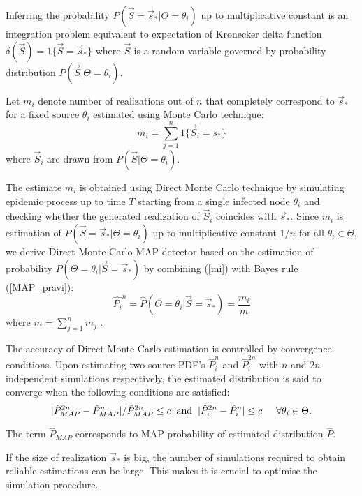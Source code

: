 \documentclass[times, utf8, diplomski]{fer}
\begin{document}
Inferring the probability  $P(\vec S = \vec s_* | \Theta = \theta_i)$ up to multiplicative constant is an integration problem equivalent to expectation of Kronecker delta function
 $\delta(\vec S) = 1\{\vec S = \vec s_{*}\}$ where $\vec S$ is a random variable governed by probability distribution $P(\vec S  | \Theta = \theta_i)$. 
 
 
 Let $m_i$ denote number of realizations out of $n$ that completely correspond to  $\vec s_*$ for a fixed source $\theta_i$ estimated using Monte Carlo technique:
\begin{equation}
 m_i = \sum_{j = 1}^{n} 1\{\vec S_i = s_{*}\}
\label{mi}
\end{equation}
where $\vec S_i$ are drawn from $P(\vec S | \Theta = \theta_i)$. 

The estimate $m_i$ is obtained using Direct Monte Carlo technique by simulating epidemic process up to time $T$ starting from a single infected node $\theta_i$ and checking whether the generated realization of $\vec S_i$ coincides with $\vec s_*$. Since $m_i$ is estimation of $P(\vec S = \vec s_* | \Theta = \theta_i)$ up to multiplicative constant $1/n$ for all $\theta_i \in \Theta$, we derive Direct Monte Carlo MAP detector based on the estimation of probability $P(\Theta = \theta_i | \vec S = \vec s_*)$ by combining (\ref{mi}) with Bayes rule  (\ref{MAP_pravi}): 
\begin{equation}
\hat{P_i}^n = \hat{P}(\Theta = \theta_i | \vec S = \vec s_*) = \frac{m_i}{m}
\end{equation}
where $m = \sum_{j = 1}^{n} m_j$ .

The accuracy of Direct Monte Carlo estimation is controlled by convergence conditions. Upon estimating two source PDF's $\hat{P}_i^n$ and $\hat{P}_i^{2n}$ with $n$ and $2n$ independent simulations respectively, the estimated distribution is said to converge when the following conditions are satisfied:
\begin{equation}
| \hat{P}_{MAP}^{2n} - \hat{P}_{MAP}^{n} | / \hat{P}_{MAP}^{2n} \leq c \hspace{2mm} \text{and} \hspace{2mm} | \hat{P}_i^{2n} - \hat{P}_i^{n} | \leq c \hspace{5mm} \forall \theta_i \in \Theta.
\label{DMCConv}
\end{equation}

The term $\hat{P}_{MAP}$ corresponds to MAP probability of estimated distribution $\hat{P}$. 

If the size of realization $\vec s_*$ is big, the number of simulations required to obtain reliable estimations can be large. This makes it is crucial to optimise the simulation procedure. 
\end{document}
